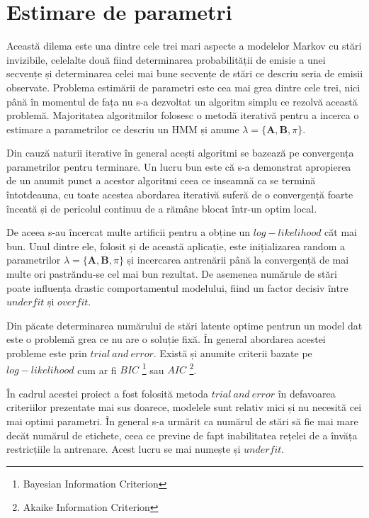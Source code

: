 \section{Estimare de parametri}
Această dilema este una dintre cele trei mari aspecte a modelelor Markov cu stări invizibile, celelalte două fiind determinarea probabilității de emisie a unei secvențe și determinarea celei mai bune secvențe de stări ce descriu seria de emisii observate. Problema estimării de parametri este cea mai grea dintre cele trei, nici până în momentul de fața nu s-a dezvoltat un algoritm simplu ce rezolvă această problemă. Majoritatea algoritmilor folosesc o metodă iterativă pentru a incerca o estimare a parametrilor ce descriu un HMM și anume $\lambda = \{\textbf{A},\textbf{B},\pi\}$.\par

Din cauză naturii iterative în general acești algoritmi se bazează pe convergența parametrilor pentru terminare. Un lucru bun este că s-a demonstrat apropierea de un anumit punct a acestor algoritmi ceea ce inseamnă ca se termină întotdeauna, cu toate acestea abordarea iterativă suferă de o convergență foarte înceată și de pericolul continuu de a rămâne blocat într-un optim local.\par

De aceea s-au încercat multe artificii pentru a obține un $log-likelihood$ căt mai bun. Unul dintre ele, folosit și de această aplicație, este inițializarea random a parametrilor $\lambda = \{\textbf{A},\textbf{B},\pi\}$ și incercarea antrenării până la convergență de mai multe ori pastrăndu-se cel mai bun rezultat. De asemenea numărule de stări poate influența drastic comportamentul modelului, fiind un factor decisiv între $underfit$ și $overfit$.\par

Din păcate determinarea numărului de stări latente optime pentrun un model dat este o problemă grea ce nu are o soluție fixă. În general abordarea acestei probleme este prin $trial\ and\ error$. Există și anumite criterii bazate pe $log-likelihood$ cum ar fi $BIC$ \footnote{Bayesian Information Criterion} sau $AIC$ \footnote{Akaike Information Criterion}.\par

În cadrul acestei proiect a fost folosită metoda $trial\ and\ error$ în defavoarea criteriilor prezentate mai sus doarece, modelele sunt relativ mici și nu necesită cei mai optimi parametri. În general s-a urmărit ca numărul de stări să fie mai mare decăt numărul de etichete, ceea ce previne de fapt inabilitatea rețelei de a învăța restricțiile la antrenare. Acest lucru se mai numește și $underfit$.\par

